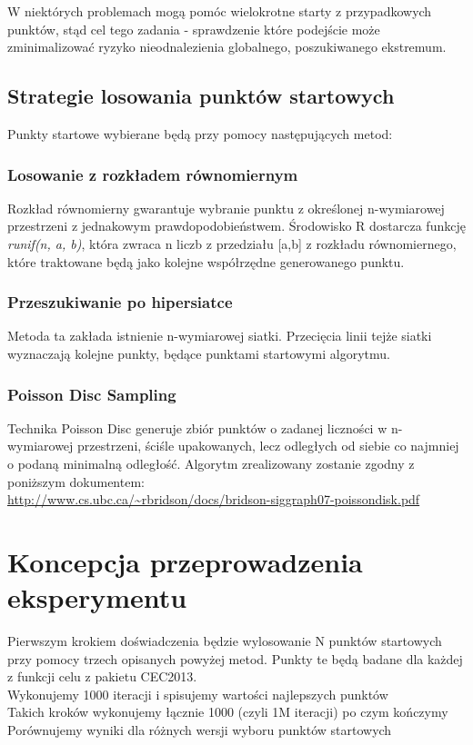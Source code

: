 \documentclass{article}
\begin{document}
W niektórych problemach mogą pomóc wielokrotne starty z przypadkowych punktów, stąd cel tego zadania - sprawdzenie które podejście może zminimalizować ryzyko nieodnalezienia globalnego, poszukiwanego ekstremum.


\subsection{Strategie losowania punktów startowych}
Punkty startowe wybierane będą przy pomocy następujących metod:

\subsubsection{Losowanie z rozkładem równomiernym}
Rozkład równomierny gwarantuje wybranie punktu z określonej n-wymiarowej przestrzeni z jednakowym prawdopodobieństwem. Środowisko R dostarcza funkcję \textit{runif(n, a, b)}, która zwraca n liczb z przedziału [a,b] z rozkładu równomiernego, które traktowane będą jako kolejne współrzędne generowanego punktu.

\subsubsection{Przeszukiwanie po hipersiatce}
Metoda ta zakłada istnienie n-wymiarowej siatki. Przecięcia linii tejże siatki wyznaczają kolejne punkty, będące punktami startowymi algorytmu.

\subsubsection{Poisson Disc Sampling}
Technika Poisson Disc generuje zbiór punktów o zadanej liczności w n-wymiarowej przestrzeni, ściśle upakowanych, lecz odległych od siebie co najmniej o podaną minimalną odległość. Algorytm zrealizowany zostanie zgodny z poniższym dokumentem:\\
\url{http://www.cs.ubc.ca/~rbridson/docs/bridson-siggraph07-poissondisk.pdf}

\section{Koncepcja przeprowadzenia eksperymentu}

Pierwszym krokiem doświadczenia będzie wylosowanie N punktów startowych przy pomocy trzech opisanych powyżej metod. Punkty te będą badane dla każdej z funkcji celu z pakietu CEC2013. \\

Wykonujemy 1000 iteracji i spisujemy wartości najlepszych punktów \\
Takich kroków wykonujemy łącznie 1000 (czyli 1M iteracji) po czym kończymy \\
Porównujemy wyniki dla różnych wersji wyboru punktów startowych \\
\end{document}
